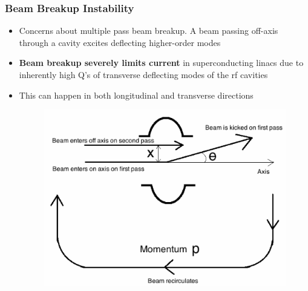 \documentclass{beamer}
\begin{document}
\begin{frame}
\frametitle{Beam Breakup Instability}
\begin{itemize}
\item Concerns about multiple pass beam breakup. A beam passing off-axis through a cavity excites deflecting higher-order modes
\item \textbf{Beam breakup severely limits current} in superconducting linacs due to inherently high Q's of transverse deflecting modes of the rf cavities
\item This can happen in both longitudinal and transverse directions
\begin{figure}
\includegraphics[width=0.60\linewidth]{figs/recirculation.png}
\end{figure}
\end{itemize}
\end{frame}


\end{document}
